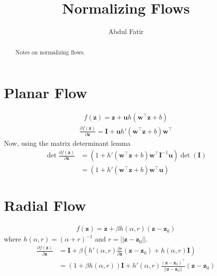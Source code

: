 \documentclass[]{article}
\title{Normalizing Flows}
\author{Abdul Fatir}
\date{}
\begin{document}
\maketitle

\begin{abstract}
Notes on normalizing flows.
\end{abstract}

\section{Planar Flow}
\begin{align*}
	f(\mathbf{z}) = \mathbf{z} + \mathbf{u}h(\mathbf{w}^\top\mathbf{z} + b)
\end{align*}
\begin{align*}
	\frac{\partial f(\mathbf{z})}{\partial \mathbf{z}} = \mathbf{I} + \mathbf{u}h'(\mathbf{w}^\top\mathbf{z} + b)\mathbf{w}^\top
\end{align*}
Now, using the matrix determinant lemma
\begin{align*}
\det\frac{\partial f(\mathbf{z})}{\partial \mathbf{z}} &= (1 + h'(\mathbf{w}^\top\mathbf{z} + b)\mathbf{w}^\top\mathbf{I}^{-1}\mathbf{u})\det(\mathbf{I})\\
&=(1 + h'(\mathbf{w}^\top\mathbf{z} + b)\mathbf{w}^\top\mathbf{u})
\end{align*}
\section{Radial Flow}
\begin{align*}
	f(\mathbf{z}) = \mathbf{z} + \beta h(\alpha,r)(\mathbf{z}-\mathbf{z}_0)
\end{align*}
where $h(\alpha,r) = (\alpha + r)^{-1}$ and $r = ||\mathbf{z}-\mathbf{z}_0||$.
\begin{align*}
\frac{\partial f(\mathbf{z})}{\partial \mathbf{z}} &= \mathbf{I} + \beta\left(h'(\alpha,r)\frac{\partial r}{\partial \mathbf{z}}(\mathbf{z}-\mathbf{z}_0) + h(\alpha,r)\mathbf{I}\right)\\
&=(1+\beta h(\alpha,r))\mathbf{I} + h'(\alpha,r)\frac{(\mathbf{z}-\mathbf{z}_0)^\top}{||\mathbf{z}-\mathbf{z}_0||}(\mathbf{z}-\mathbf{z}_0)
\end{align*}
\end{document}
